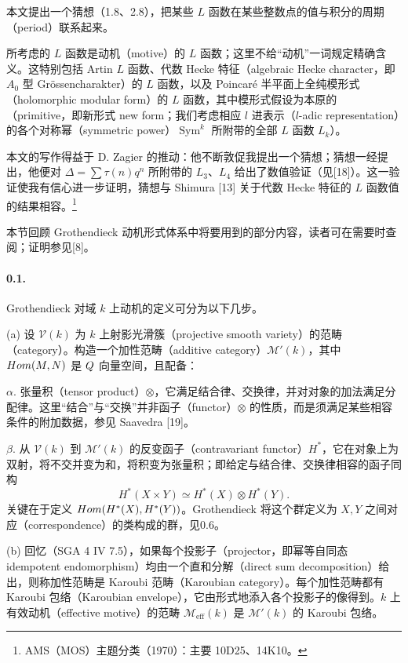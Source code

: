 
本文提出一个猜想（1.8、2.8），把某些 $L$ 函数在某些整数点的值与积分的周期（period）联系起来。

所考虑的 $L$ 函数是动机（motive）的 $L$ 函数；这里不给“动机”一词规定精确含义。这特别包括 Artin $L$ 函数、代数 Hecke 特征（algebraic Hecke character，即 $A_0$ 型 Grössencharakter）的 $L$ 函数，以及 Poincaré 半平面上全纯模形式（holomorphic modular form）的 $L$ 函数，其中模形式假设为本原的（primitive，即新形式 new form；我们考虑相应 $l$ 进表示（$l$-adic representation）的各个对称幂（symmetric power）$\operatorname{Sym}^k$ 所附带的全部 $L$ 函数 $L_k$）。

本文的写作得益于 D. Zagier 的推动：他不断敦促我提出一个猜想；猜想一经提出，他便对 $\Delta=\sum\tau(n)q^n$ 所附带的 $L_3$、$L_4$ 给出了数值验证（见[18]）。这一验证使我有信心进一步证明，猜想与 Shimura [13] 关于代数 Hecke 特征的 $L$ 函数值的结果相容。\footnote{AMS（MOS）主题分类（1970）：主要 10D25、14K10。}

本节回顾 Grothendieck 动机形式体系中将要用到的部分内容，读者可在需要时查阅；证明参见[8]。

\paragraph*{0.1.} Grothendieck 对域 $k$ 上动机的定义可分为以下几步。

(a) 设 $\mathcal V(k)$ 为 $k$ 上射影光滑簇（projective smooth variety）的范畴（category）。构造一个加性范畴（additive category）$\mathcal M'(k)$，其中 $Hom(M,N)$ 是 $Q$ 向量空间，且配备：

$\alpha$. 张量积（tensor product）$\otimes$，它满足结合律、交换律，并对对象的加法满足分配律。这里“结合”与“交换”并非函子（functor）$\otimes$ 的性质，而是须满足某些相容条件的附加数据，参见 Saavedra [19]。

$\beta$. 从 $\mathcal V(k)$ 到 $\mathcal M'(k)$ 的反变函子（contravariant functor）$H^*$，它在对象上为双射，将不交并变为和，将积变为张量积；即给定与结合律、交换律相容的函子同构
\[
 H^*(X\times Y)\simeq H^*(X)\otimes H^*(Y).
\]
关键在于定义 $Hom(H^*(X),H^*(Y))$。Grothendieck 将这个群定义为 $X,Y$ 之间对应（correspondence）的类构成的群，见0.6。

(b) 回忆（SGA 4 IV 7.5），如果每个投影子（projector，即幂等自同态 idempotent endomorphism）均由一个直和分解（direct sum decomposition）给出，则称加性范畴是 Karoubi 范畴（Karoubian category）。每个加性范畴都有 Karoubi 包络（Karoubian envelope），它由形式地添入各个投影子的像得到。$k$ 上有效动机（effective motive）的范畴 $\mathcal M_{\mathrm{eff}}(k)$ 是 $\mathcal M'(k)$ 的 Karoubi 包络。

